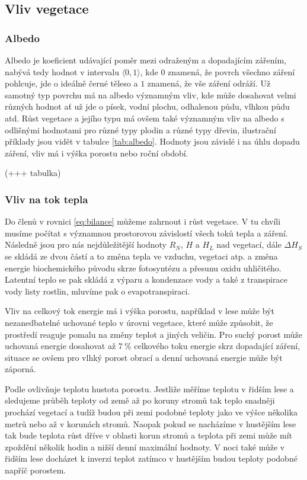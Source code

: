 \subsection{Vliv vegetace} \label{chap:veg}
\subsubsection{Albedo}
Albedo je koeficient udávající poměr mezi odraženým a dopadajícím zářením, nabývá tedy hodnot v intervalu $\langle 0,1\rangle$, kde $0$ znamená, že povrch všechno záření pohlcuje, jde o ideálně černé těleso a $1$ znamená, že vše záření odráží. Už samotný typ povrchu má na albedo významným vliv, kde může dosahovat velmi různých hodnot ať už jde o písek, vodní plochu, odhalenou půdu, vlhkou půdu atd. Růst vegetace a jejího typu má ovšem také významným vliv na albedo s odlišnými hodnotami pro různé typy plodin a různé typy dřevin, ilustrační příklady jsou vidět v tabulce \ref{tab:albedo}. Hodnoty jsou závislé i na úhlu dopadu záření, vliv má i výška porostu nebo roční období\cite{arya2001,alma}.

(+++ tabulka)

\subsubsection{Vliv na tok tepla}
Do členů v rovnici \ref{eq:bilance} můžeme zahrnout i růst vegetace. V tu chvíli musíme počítat s významnou prostorovou závislostí všech toků tepla a záření. Následně jsou pro nás nejdůležitější hodnoty $R_N$, $H$ a $H_L$ nad vegetací, dále $\Delta H_S$ se skládá ze dvou částí a to změna tepla ve vzduchu, vegetaci atp. a změna energie biochemického původu skrze fotosyntézu a přesunu oxidu uhličitého. Latentní teplo se pak skládá z výparu a kondenzace vody a také z transpirace vody listy rostlin, mluvíme pak o evapotranspiraci\cite{arya2001}. 

Vliv na celkový tok energie má i výška porostu, například v lese může být nezanedbatelné uchované teplo v úrovni vegetace, které může způsobit, že prostředí reaguje pomalu na změny teplot a jiných veličin. Pro suchý porost může uchovaná energie dosahovat až $\SI{7}{\%}$ celkového toku energie skrz dopadající záření, situace se ovšem pro vlhký porost obrací a denní uchovaná energie může být záporná\cite{alma}. 

Podle \cite{alma} ovlivňuje teplotu hustota porostu. Jestliže měříme teplotu v řidším lese a sledujeme průběh teploty od země až po koruny stromů tak teplo snadněji prochází vegetací a tudíž budou při zemi podobné teploty jako ve výšce několika metrů nebo až v korunách stromů. Naopak pokud se nacházíme v hustějším lese tak bude teplota růst dříve v oblasti korun stromů a teplota při zemi může mít zpoždění několik hodin a nižší denní maximální hodnoty. V noci také může v řidším lese docházet k inverzi teplot zatímco v hustějším budou teploty podobné napříč porostem. 

